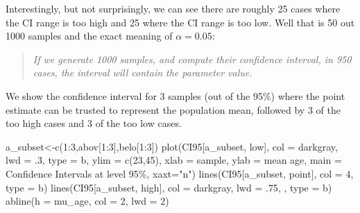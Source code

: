 \documentclass[
  letterpaper,
  DIV=11,
  numbers=noendperiod]{scrreprt}
\newenvironment{Shaded}{\begin{snugshade}}{\end{snugshade}}
\newcommand{\AttributeTok}[1]{\textcolor[rgb]{0.40,0.45,0.13}{#1}}
\newcommand{\DecValTok}[1]{\textcolor[rgb]{0.68,0.00,0.00}{#1}}
\newcommand{\FunctionTok}[1]{\textcolor[rgb]{0.28,0.35,0.67}{#1}}
\newcommand{\NormalTok}[1]{\textcolor[rgb]{0.00,0.23,0.31}{#1}}
\newcommand{\OtherTok}[1]{\textcolor[rgb]{0.00,0.23,0.31}{#1}}
\newcommand{\SpecialCharTok}[1]{\textcolor[rgb]{0.37,0.37,0.37}{#1}}
\newcommand{\StringTok}[1]{\textcolor[rgb]{0.13,0.47,0.30}{#1}}
\begin{document}
Interestingly, but not surprisingly, we can see there are roughly 25
cases where the CI range is too high and 25 where the CI range is too
low. Well that is 50 out 1000 samples and the exact meaning of
\(\alpha=0.05\):

\begin{quote}
\emph{If we generate 1000 samples, and compute their confidence
interval, in 950 cases, the interval will contain the parameter value.}
\end{quote}

We show the confidence interval for 3 samples (out of the 95\%) where
the point estimate can be trusted to represent the population mean,
followed by 3 of the too high cases and 3 of the too low cases.

\begin{Shaded}
\begin{Highlighting}[]
\NormalTok{a\_subset}\OtherTok{\textless{}{-}}\FunctionTok{c}\NormalTok{(}\DecValTok{1}\SpecialCharTok{:}\DecValTok{3}\NormalTok{,abov[}\DecValTok{1}\SpecialCharTok{:}\DecValTok{3}\NormalTok{],belo[}\DecValTok{1}\SpecialCharTok{:}\DecValTok{3}\NormalTok{])}
\FunctionTok{plot}\NormalTok{(CI95[a\_subset, }\StringTok{\textquotesingle{}low\textquotesingle{}}\NormalTok{], }\AttributeTok{col =} \StringTok{\textquotesingle{}darkgray\textquotesingle{}}\NormalTok{, }\AttributeTok{lwd =}\NormalTok{ .}\DecValTok{3}\NormalTok{, }
     \AttributeTok{type =} \StringTok{\textquotesingle{}b\textquotesingle{}}\NormalTok{, }\AttributeTok{ylim =} \FunctionTok{c}\NormalTok{(}\DecValTok{23}\NormalTok{,}\DecValTok{45}\NormalTok{), }
     \AttributeTok{xlab =} \StringTok{\textquotesingle{}sample\textquotesingle{}}\NormalTok{, }\AttributeTok{ylab =} \StringTok{\textquotesingle{}mean age\textquotesingle{}}\NormalTok{,}
     \AttributeTok{main =} \StringTok{\textquotesingle{}Confidence Intervals at level 95\%\textquotesingle{}}\NormalTok{,}
     \AttributeTok{xaxt=}\StringTok{"n"}\NormalTok{)}
\FunctionTok{lines}\NormalTok{(CI95[a\_subset, }\StringTok{\textquotesingle{}point\textquotesingle{}}\NormalTok{], }\AttributeTok{col =} \DecValTok{4}\NormalTok{, }\AttributeTok{type =} \StringTok{\textquotesingle{}b\textquotesingle{}}\NormalTok{)}
\FunctionTok{lines}\NormalTok{(CI95[a\_subset, }\StringTok{\textquotesingle{}high\textquotesingle{}}\NormalTok{], }\AttributeTok{col =} \StringTok{\textquotesingle{}darkgray\textquotesingle{}}\NormalTok{, }\AttributeTok{lwd =}\NormalTok{ .}\DecValTok{75}\NormalTok{, , }\AttributeTok{type =} \StringTok{\textquotesingle{}b\textquotesingle{}}\NormalTok{)}
\FunctionTok{abline}\NormalTok{(}\AttributeTok{h =}\NormalTok{ mu\_age, }\AttributeTok{col =} \DecValTok{2}\NormalTok{, }\AttributeTok{lwd =} \DecValTok{2}\NormalTok{)}

\end{Highlighting}
\end{Shaded}
\end{document}
